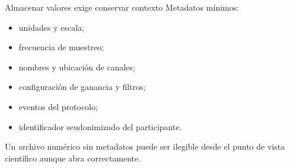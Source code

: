\documentclass[
  ignorenonframetext,
  aspectratio=169,
  spanish,
]{beamer}
\providecommand{\tightlist}{%
  \setlength{\itemsep}{0pt}\setlength{\parskip}{0pt}}
\begin{document}
\begin{frame}{Almacenar valores exige conservar contexto}
  \protect{}\label{almacenar-valores-exige-conservar-contexto}
  Metadatos mínimos:

  \begin{itemize}
    \tightlist
    \item
          unidades y escala;
    \item
          frecuencia de muestreo;
    \item
          nombres y ubicación de canales;
    \item
          configuración de ganancia y filtros;
    \item
          eventos del protocolo;
    \item
          identificador seudonimizado del participante.
  \end{itemize}

  \begin{tcolorbox}[enhanced jigsaw, arc=.35mm, bottomrule=.15mm, bottomtitle=1mm, breakable, colback=white, colbacktitle=quarto-callout-warning-color!10!white, colframe=quarto-callout-warning-color-frame, coltitle=black, left=2mm, leftrule=.75mm, opacityback=0, opacitybacktitle=0.6, rightrule=.15mm, title=\textcolor{quarto-callout-warning-color}{\faExclamationTriangle}\hspace{0.5em}{Advertencia}, titlerule=0mm, toprule=.15mm, toptitle=1mm]

    Un archivo numérico sin metadatos puede ser ilegible desde el punto de
    vista científico aunque abra correctamente.

  \end{tcolorbox}
\end{frame}
\end{document}
